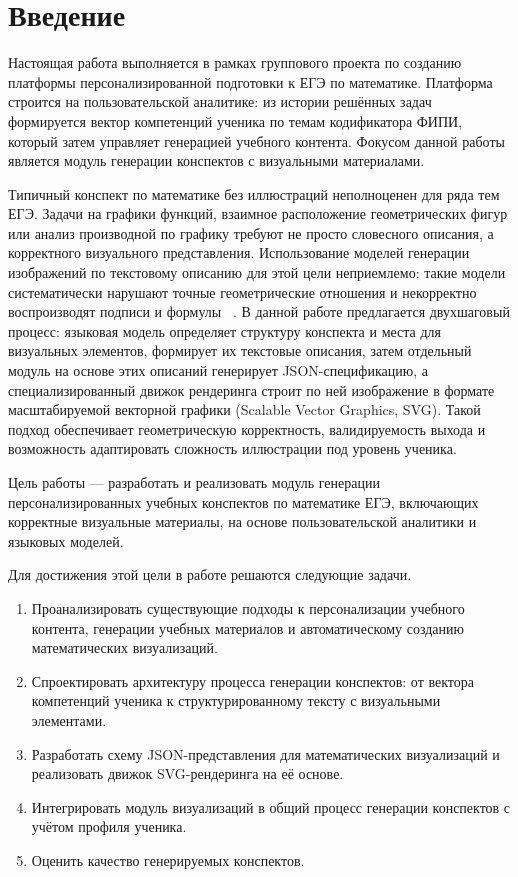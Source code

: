 \section*{Введение}

Настоящая работа выполняется в рамках группового проекта по созданию платформы персонализированной подготовки к ЕГЭ по математике. 
Платформа строится на пользовательской аналитике: из истории решённых задач формируется вектор компетенций ученика по темам кодификатора ФИПИ, который затем управляет генерацией учебного контента. Фокусом данной работы является модуль генерации конспектов с визуальными материалами.

Типичный конспект по математике без иллюстраций неполноценен для ряда тем ЕГЭ. Задачи на графики функций, взаимное расположение геометрических фигур или анализ производной по графику требуют не просто словесного описания, а корректного визуального представления. Использование моделей генерации изображений по текстовому описанию для этой цели неприемлемо: такие модели систематически нарушают точные геометрические отношения и некорректно воспроизводят подписи и формулы ~\cite{Bosheah2025, Wang2025MagicGeo}. В данной работе предлагается двухшаговый процесс: языковая модель определяет структуру конспекта и места для визуальных элементов, формирует их текстовые описания, затем отдельный модуль на основе этих описаний генерирует JSON-спецификацию, а специализированный движок рендеринга строит по ней изображение в формате масштабируемой векторной графики (Scalable Vector Graphics, SVG). Такой подход обеспечивает геометрическую корректность, валидируемость выхода и возможность адаптировать сложность иллюстрации под уровень ученика.

Цель работы --- разработать и реализовать модуль генерации персонализированных учебных конспектов по математике ЕГЭ, включающих корректные визуальные материалы, на основе пользовательской аналитики и языковых моделей.

Для достижения этой цели в работе решаются следующие задачи.

\begin{enumerate}
    \item Проанализировать существующие подходы к персонализации учебного контента, генерации учебных материалов и автоматическому созданию математических визуализаций.
    \item Спроектировать архитектуру процесса генерации конспектов: от вектора компетенций ученика к структурированному тексту с визуальными элементами.
    \item Разработать схему JSON-представления для математических визуализаций и реализовать движок SVG-рендеринга на её основе.
    \item Интегрировать модуль визуализаций в общий процесс генерации конспектов с учётом профиля ученика.
    \item Оценить качество генерируемых конспектов.
\end{enumerate}

